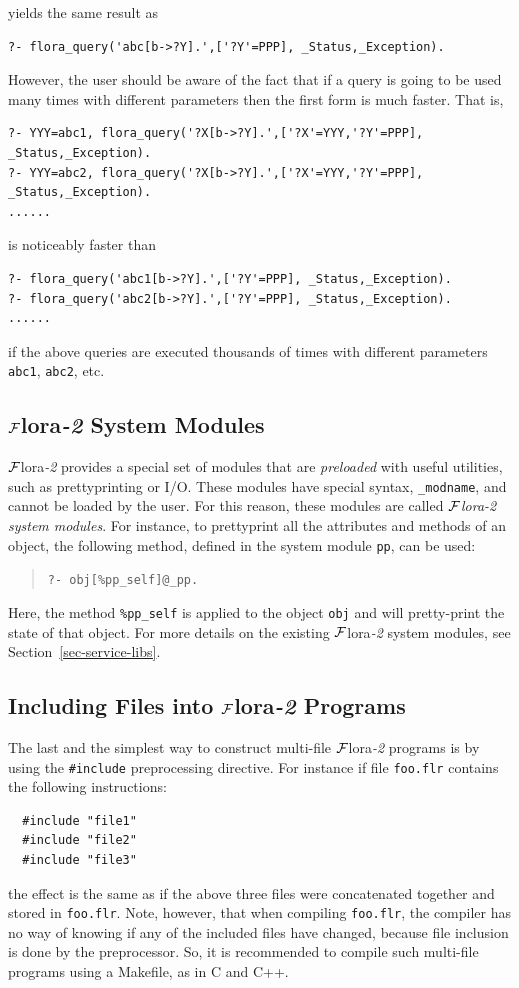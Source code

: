\documentclass[11pt]{article}
\newcommand{\FLORA}{{\mbox{\sc ${\cal F}${lora}\rm\emph{-2}}}\xspace}
\begin{document}
yields the same result as
\begin{verbatim}
?- flora_query('abc[b->?Y].',['?Y'=PPP], _Status,_Exception).
\end{verbatim}
However, the user should be aware of the fact that if a query is going to
be used many times with different parameters then the first form is much
faster. That is,
\begin{verbatim}
?- YYY=abc1, flora_query('?X[b->?Y].',['?X'=YYY,'?Y'=PPP], _Status,_Exception).
?- YYY=abc2, flora_query('?X[b->?Y].',['?X'=YYY,'?Y'=PPP], _Status,_Exception).
......
\end{verbatim}
is noticeably faster than
\begin{verbatim}
?- flora_query('abc1[b->?Y].',['?Y'=PPP], _Status,_Exception).
?- flora_query('abc2[b->?Y].',['?Y'=PPP], _Status,_Exception).
......
\end{verbatim}
if the above queries are executed thousands of times with different
parameters {\tt abc1}, {\tt abc2}, etc.

\subsection{\FLORA System Modules}\label{sec-flora-system-modules}

\FLORA provides a special set of modules that are \emph{preloaded} with
useful utilities, such as prettyprinting or I/O. These modules have special
syntax, {\tt \_modname}, and cannot be loaded by the user. For this
reason, these modules are called \emph{\FLORA system modules}.  For
instance, to prettyprint all the attributes and methods of an object, the
following method, defined in the system module {\tt pp}, can be used:
\begin{quote}
 \tt      ?- obj[\%pp\_self]@\_pp.
\end{quote}
Here, the method {\tt \%pp\_self} is applied to the object {\tt obj} and
will pretty-print the state of that object.
For more details on the existing \FLORA system modules, see
Section~\ref{sec-service-libs}.


\subsection{Including Files into \FLORA Programs}

The last and the simplest way to construct multi-file \FLORA 
programs is by using the {\tt \#include} preprocessing directive.
For instance if file {\tt foo.flr} contains the following instructions:
\begin{verbatim}
  #include "file1" 
  #include "file2"
  #include "file3"
\end{verbatim}
the effect is the same as if the above three files were concatenated
together and stored in {\tt foo.flr}.
Note, however, that when compiling {\tt foo.flr}, the compiler has no way
of knowing if any of the included files have changed, because file
inclusion is done by the preprocessor. So, it is recommended to compile
such multi-file programs using a Makefile, as in C and C++.
\end{document}
